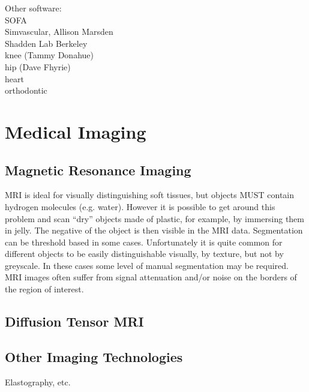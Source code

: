 \documentclass[12pt]{article}
\begin{document}
Other software:\\
SOFA\\
Simvascular, Allison Marsden\\
Shadden Lab Berkeley\\
knee (Tammy Donahue) \\
hip (Dave Fhyrie) \\
heart \\
orthodontic \\
\newpage
\section{Medical Imaging}
\label{Medical Imaging}

\subsection{Magnetic Resonance Imaging}
\label{Magnetic Resonance Imaging}

MRI is ideal for visually distinguishing soft tissues, but objects MUST contain hydrogen molecules (e.g. water). However it is possible to get around this problem and scan “dry” objects made of plastic, for example, by immersing them in jelly. The negative of the object is then visible in the MRI data. Segmentation can be threshold based in some cases. Unfortunately it is quite common for different objects to be easily distinguishable visually, by texture, but not by greyscale. In these cases some level of manual segmentation may be required. MRI images often suffer from signal attenuation and/or noise on the borders of the region of interest.

\subsection{Diffusion Tensor MRI}
\label{Diffusion Tensor MRI}

\subsection{Other Imaging Technologies}
\label{Other Imaging Technologies}
Elastography, etc.
\newpage
\end{document}
